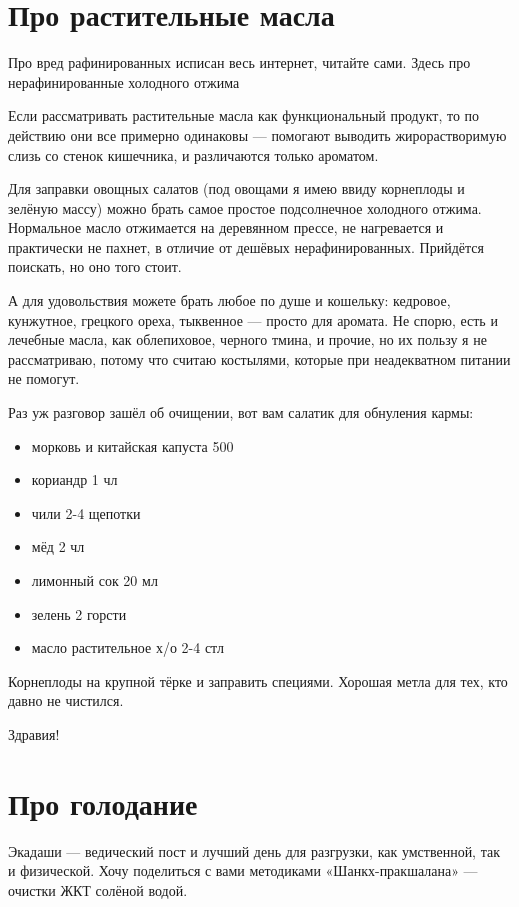 \section{Про растительные масла}

Про вред рафинированных исписан весь интернет, читайте сами. Здесь про нерафинированные холодного отжима

Если рассматривать растительные масла как функциональный продукт, то по действию они все примерно одинаковы — помогают выводить жирорастворимую слизь со стенок кишечника, и различаются только ароматом. 

Для заправки овощных салатов (под овощами я имею ввиду корнеплоды и зелёную массу) можно брать самое простое подсолнечное холодного отжима. Нормальное масло отжимается на деревянном прессе, не нагревается и практически не пахнет, в отличие от дешёвых нерафинированных. Прийдётся поискать, но оно того стоит.

А для удовольствия можете брать любое по душе и кошельку: кедровое, кунжутное, грецкого ореха, тыквенное — просто для аромата.
Не спорю, есть и лечебные масла, как облепиховое, черного тмина, и прочие, но их пользу я не рассматриваю, потому что считаю костылями, которые при неадекватном питании не помогут.

Раз уж разговор зашёл об очищении, вот вам салатик для обнуления кармы:
\begin{itemize}

\item морковь и китайская капуста 500
\item кориандр 1 чл
\item чили 2-4 щепотки
\item мёд 2 чл
\item лимонный сок 20 мл
\item зелень 2 горсти
\item масло растительное х/о 2-4 стл
\end{itemize}

Корнеплоды на крупной тёрке и заправить специями. Хорошая метла для тех, кто давно не чистился. 


Здравия!


\section{Про голодание}
Экадаши — ведический пост и лучший день для разгрузки, как умственной, так и физической. Хочу поделиться с вами методиками «Шанкх-пракшалана» — очистки ЖКТ солёной водой.

